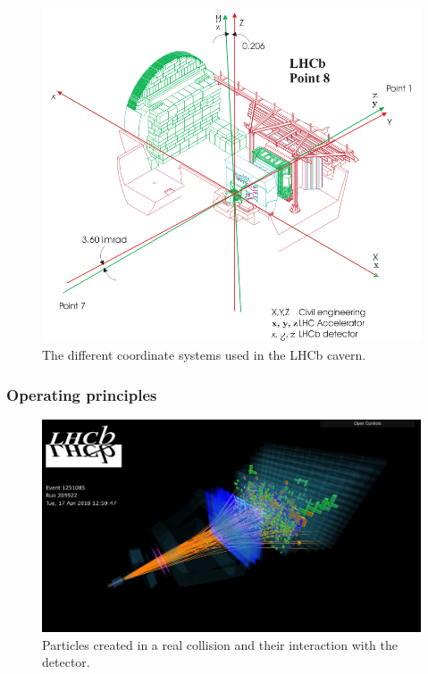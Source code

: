\documentclass[12pt]{article}
\begin{document}
\begin{figure}[H]
	\includegraphics[width=\textwidth]{intro_lhcb_coordinate_systems}
	\caption{The different coordinate systems used in the LHCb cavern.}
	\label{fig_lhcb_coordinate_systems}
\end{figure}


\subsubsection{Operating principles}\label{sec_lhcb_det_theory}

\begin{figure}[H]
	\includegraphics[width=\textwidth]{lbevent_collision_example}
	\caption{Particles created in a real collision and their interaction with the detector.}
	\label{fig_lhcb_lbevent_collision}
\end{figure}
\end{document}
